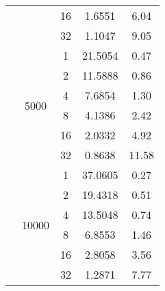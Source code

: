 \begin{tabularx}{\textwidth}{@{} c c c c c @{}}
                            &                       & 16 & 1.6551  & 6.04 \\
                            &                       & 32 & 1.1047  & 9.05 \\
                            \cmidrule{2-5}
                            & \multirow{6}{*}{5000} & 1  & 21.5054 & 0.47  \\
                            &                       & 2  & 11.5888 & 0.86  \\
                            &                       & 4  & 7.6854  & 1.30  \\
                            &                       & 8  & 4.1386  & 2.42  \\
                            &                       & 16 & 2.0332  & 4.92  \\
                            &                       & 32 & 0.8638  & 11.58 \\
                            \cmidrule{2-5}
                            & \multirow{6}{*}{10000} & 1  & 37.0605 & 0.27 \\
                            &                        & 2  & 19.4318 & 0.51 \\
                            &                        & 4  & 13.5048 & 0.74 \\
                            &                        & 8  & 6.8553  & 1.46 \\
                            &                        & 16 & 2.8058  & 3.56 \\
                            &                        & 32 & 1.2871  & 7.77 \\
\bottomrule
\end{tabularx}
